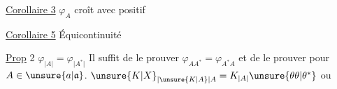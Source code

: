 \uline{Corollaire 3} $\varphi_A$ croît avec  positif  

 \uline{Corollaire 5} Équicontinuité  

\uline{Prop} 2 $\varphi_{\lvert A\rvert}=\varphi_{\lvert A^*\rvert}$ Il suffit de le prouver  $\varphi_{AA^*}=\varphi_{A^*A}$ et de le prouver pour $A\in\unsure{a|\mathfrak a}$.   $\unsure{K|X}_{\lvert\unsure{K|A}\rvert A} = K_{\lvert A\rvert}\unsure{\theta\theta|\theta^*}$ ou \unsure{$\int$} 

